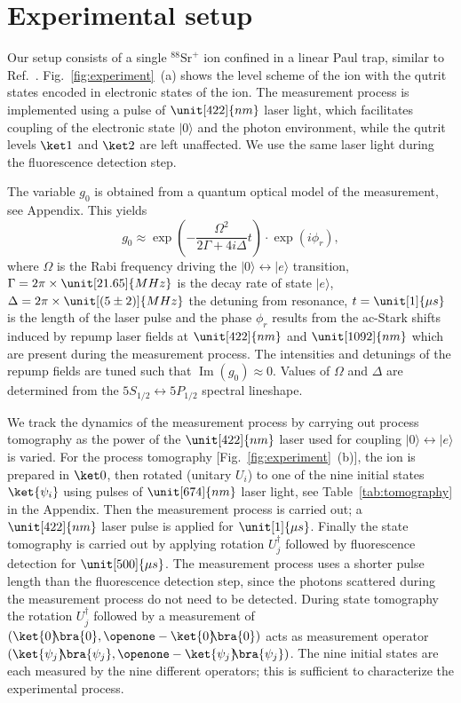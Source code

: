 \documentclass[12pt,
onecolumn,
superscriptaddress,
floatfix,
]{revtex4-2}
\DeclareMathOperator{\im}{Im}
\newcommand{\ketbra}[2]{{\ket{#1}\!\!\bra{#2}}}
\newcommand{\proj}[1]{{\ketbra{#1}{#1}}}
\begin{document}
\section{Experimental setup}

Our setup consists of a single $^{88}\mathrm{Sr}^{+}$ ion confined in a linear 
 Paul trap, similar to Ref.~\cite{Higgins17}.
Fig.~\ref{fig:experiment}~(a) shows the level scheme of the ion with the qutrit states
 encoded in electronic states of the ion.
The measurement process is implemented using a pulse of $\unit[422]{nm}$ 
 laser light, which facilitates coupling of the electronic state $|0\rangle$
 and the photon environment, while the qutrit levels $\ket1$ and $\ket2$ are left unaffected.
We use the same laser light during the fluorescence detection step.

The variable $g_0$ is obtained from a quantum optical model of the 
 measurement, see Appendix.
This yields
%
\begin{equation}\label{eq:a0}
 g_0\approx \exp\left(-\frac{\Omega^2}{2\Gamma + 4 i \Delta} t\right) \cdot \exp\left(i \phi_{r} \right),
\end{equation}
%
 where $\Omega$ is the Rabi frequency driving the $|0\rangle \leftrightarrow |e\rangle$ transition, $\Gamma= 
 2\pi\times \unit[21.65]{MHz}$ \cite{Gallagher67} is the decay rate of state 
 $|e\rangle$, $\Delta= 2\pi\times \unit[(5\pm2)]{MHz}$ the detuning from 
 resonance, $t= \unit[1]{\mu s}$ is the length of the laser pulse and the phase $\phi_{r}$ results from the ac-Stark shifts induced by repump laser fields at $\unit[422]{nm}$ and $\unit[1092]{nm}$ which are present during the measurement process. The intensities and detunings of the repump fields are tuned such that $\im\left(g_0\right)\approx 0$.
Values of $\Omega$ and $\Delta$ are determined from the $5S_{1/2} \leftrightarrow 5P_{1/2}$ spectral lineshape.

We track the dynamics of the measurement process by carrying out
 process tomography as the power of the $\unit[422]{nm}$ laser used for coupling $|0\rangle \leftrightarrow |e\rangle$ is varied.
For the process tomography [Fig.~\ref{fig:experiment}~(b)], the ion is prepared in $\ket0$, then rotated (unitary $U_i$) to one of the nine 
 initial states $\ket{\psi_i}$ using pulses of $\unit[674]{nm}$ laser light, 
 see Table~\ref{tab:tomography} in the Appendix.
Then the measurement process is carried out; a $\unit[422]{nm}$ laser pulse is applied for $\unit[1]{\mu s}$.
Finally the state 
 tomography is carried out by applying rotation $U_j^\dag$ followed by fluorescence detection for $\unit[500]{\mu s}$.
The measurement process uses a shorter pulse length than the fluorescence detection step, since the photons scattered during the measurement process do not need to be detected.
During state tomography the rotation $U_j^\dag$ followed by a measurement of $(\proj0,\openone-\proj0)$ 
 acts as measurement operator $(\proj{\psi_j},\openone-\proj{\psi_j})$.
The nine initial states are each measured by the nine different operators; this is sufficient to characterize the experimental process.
\end{document}
